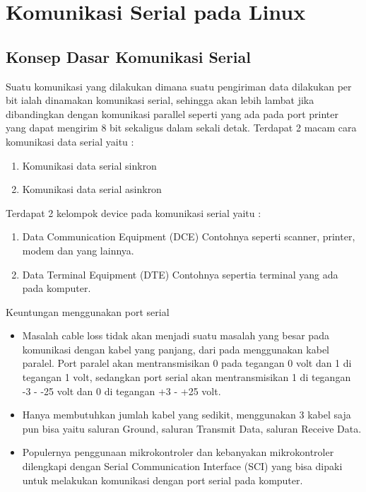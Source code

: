 
\section{Komunikasi Serial pada Linux}
	
	\subsection{Konsep Dasar Komunikasi Serial}
	Suatu komunikasi yang dilakukan dimana suatu pengiriman data dilakukan per bit ialah dinamakan komunikasi serial, sehingga akan lebih lambat jika dibandingkan dengan komunikasi parallel seperti yang ada pada port printer yang dapat mengirim 8 bit sekaligus dalam sekali detak.
	Terdapat 2 macam cara komunikasi data serial yaitu :
		\begin{enumerate}
			\item Komunikasi data serial sinkron
			\item Komunikasi data serial asinkron
		\end{enumerate}
	
	Terdapat 2 kelompok device pada komunikasi serial yaitu :
		\begin{enumerate}
			\item Data Communication Equipment (DCE)
			Contohnya seperti scanner, printer, modem dan yang lainnya.
			\item Data Terminal Equipment (DTE)
			Contohnya sepertia terminal yang ada pada komputer.
		\end{enumerate}
	
	Keuntungan menggunakan port serial
		\begin{itemize}
			\item Masalah cable loss tidak akan menjadi suatu masalah yang besar pada komunikasi dengan kabel yang panjang, dari pada menggunakan kabel paralel. Port paralel akan mentransmisikan 0 pada tegangan 0 volt dan 1 di tegangan 1 volt, sedangkan port serial akan mentransmisikan 1 di tegangan -3 - -25 volt dan 0 di tegangan +3 - +25 volt.
			\item Hanya membutuhkan jumlah kabel yang sedikit, menggunakan 3 kabel saja pun bisa yaitu saluran Ground, saluran Transmit Data, saluran Receive Data.
			\item Populernya penggunaan mikrokontroler dan kebanyakan mikrokontroler dilengkapi dengan Serial Communication Interface (SCI) yang bisa dipaki untuk melakukan komunikasi dengan port serial pada komputer.
		\end{itemize}

